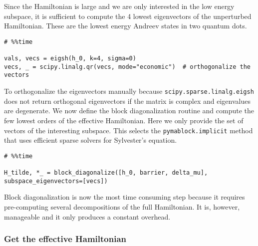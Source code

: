 Since the Hamiltonian is large and we are only interested in the low energy
subspace, it is sufficient to compute the 4 lowest eigenvectors of the
unperturbed Hamiltonian.
These are the lowest energy Andreev states in two quantum dots.
%
\begin{verbatim}
# %%time

vals, vecs = eigsh(h_0, k=4, sigma=0)
vecs, _ = scipy.linalg.qr(vecs, mode="economic")  # orthogonalize the vectors
\end{verbatim}
%
To orthogonalize the eigenvectors manually because
\texttt{scipy.sparse.linalg.eigsh} does not return orthogonal eigenvectors if the
matrix is complex and eigenvalues are degenerate.
%
We now define the block diagonalization routine and compute the few lowest
orders of the effective Hamiltonian.
Here we only provide the set of vectors of the interesting subspace.
This selects the \texttt{pymablock.implicit} method that uses efficient sparse
solvers for Sylvester's equation.
%
\begin{verbatim}
# %%time

H_tilde, *_ = block_diagonalize([h_0, barrier, delta_mu], subspace_eigenvectors=[vecs])
\end{verbatim}
%
Block diagonalization is now the most time consuming step because it requires
pre-computing several decompositions of the full Hamiltonian.
It is, however, manageable and it only produces a constant overhead.

\subsubsection{Get the effective Hamiltonian}

